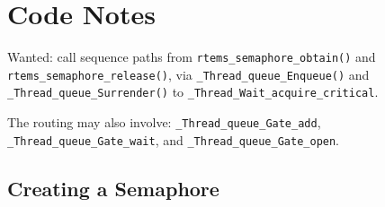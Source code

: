 \section{Code Notes}

Wanted: call sequence paths from
\verb"rtems_semaphore_obtain()"
and
\verb"rtems_semaphore_release()",
via
\verb"_Thread_queue_Enqueue()"
and
\verb"_Thread_queue_Surrender()"
to
\verb"_Thread_Wait_acquire_critical".

The routing may also involve:
\verb"_Thread_queue_Gate_add",
\verb"_Thread_queue_Gate_wait",
and
\verb"_Thread_queue_Gate_open".

\subsection{Creating a Semaphore}

